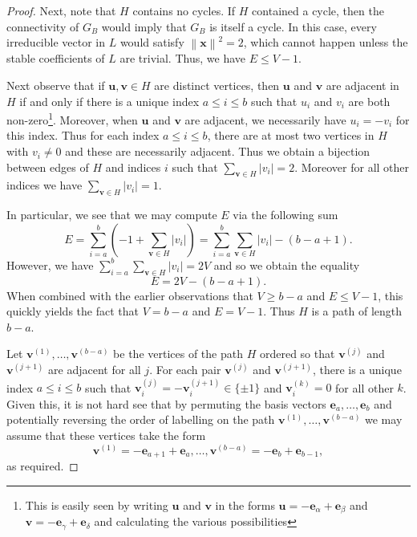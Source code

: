 \documentclass{amsart} %
\newcommand{\e}{\bm{e}}
\newcommand{\bv}{\bm{v}}
\newcommand{\norm}[1]{\left\lVert #1 \right\rVert^2}
\theoremstyle{thm}
\theoremstyle{definition}
\numberwithin{equation}{section}
\begin{document}
\begin{proof}
Next, note that $H$ contains no cycles. If $H$ contained a cycle, then the connectivity of $G_B$ would imply that $G_B$ is itself a cycle. In this case, every irreducible vector in $L$ would satisfy $\norm{\bm{x}}=2$, which cannot happen unless the stable coefficients of $L$ are trivial. Thus, we have $E\leq V-1$.

Next observe that if $\bm{u},\bv\in H$ are distinct vertices, then $\bm{u}$ and $\bv$ are adjacent in $H$ if and only if there is a unique index $a\leq i\leq b$ such that $u_i$ and $v_i$ are both non-zero\footnote{This is easily seen by writing $\bm{u}$ and $\bv$ in the forms $\bm{u}=-\e_\alpha + \e_\beta$ and $\bv=-\e_\gamma +\e_\delta$ and calculating the various possibilities}. Moreover, when $\bm{u}$ and $\bv$ are adjacent, we necessarily have $u_i=-v_i$ for this index. Thus for each index $a\leq i\leq b$, there are at most two vertices in $H$ with $v_i\neq 0$ and these are necessarily adjacent. Thus we obtain a bijection between edges of $H$ and indices $i$ such that $\sum_{\bv \in H} |v_i|=2$. Moreover for all other indices we have $\sum_{\bv \in H} |v_i|=1$.

In particular, we see that we may compute $E$ via the following sum
\[
E=\sum_{i=a}^b \left(-1+\sum_{\bv\in H} |v_i|  \right)=\sum_{i=a}^b \sum_{\bv\in H} |v_i| -(b-a+1).
\]
However, we have $\sum_{i=a}^b \sum_{\bv\in H} |v_i|=2V$ and so we obtain the equality
\[
E=2V -(b-a+1).
\]
When combined with the earlier observations that $V\geq b-a$ and $E\leq V -1$, this quickly yields the fact that $V=b-a$ and $E=V-1$. Thus $H$ is a path of length $b-a$.

Let $\bv^{(1)}, \dots, \bv^{(b-a)}$ be the vertices of the path $H$ ordered so that $\bv^{(j)}$ and $\bv^{(j+1)}$ are adjacent for all $j$. For each pair $\bv^{(j)}$ and $\bv^{(j+1)}$, there is a unique index $a\leq i \leq b$ such that $\bv^{(j)}_i=-\bv^{(j+1)}_i\in \{\pm 1\}$ and $\bv^{(k)}_i=0$ for all other $k$. Given this, it is not hard see that by permuting the basis vectors $\e_a, \dots, \e_b$ and potentially reversing the order of labelling on the path $\bv^{(1)}, \dots, \bv^{(b-a)}$ we may assume that these vertices take the form   
\[
\bv^{(1)}=-\e_{a+1}+\e_a, \dots, \bv^{(b-a)}=-\e_b+\e_{b-1},
\]
as required.
\end{proof}
\end{document}
